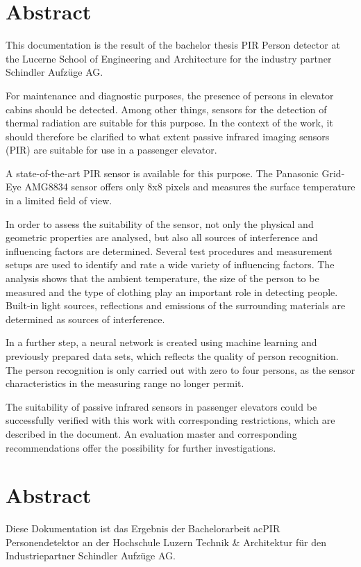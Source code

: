 \chapter*{Abstract}
\label{chap:abstract_german}
This documentation is the result of the bachelor thesis PIR Person detector at the Lucerne School of Engineering and Architecture for the industry partner Schindler Aufzüge AG.

For maintenance and diagnostic purposes, the presence of persons in elevator cabins should be detected. Among other things, sensors for the detection of thermal radiation are suitable for this purpose. In the context of the work, it should therefore be clarified to what extent passive infrared imaging sensors (PIR) are suitable for use in a passenger elevator. 

A state-of-the-art PIR sensor is available for this purpose. The Panasonic Grid-Eye AMG8834 sensor offers only 8x8 pixels and measures the surface temperature in a limited field of view.  

In order to assess the suitability of the sensor, not only the physical and geometric properties are analysed, but also all sources of interference and influencing factors are determined. Several test procedures and measurement setups are used to identify and rate a wide variety of influencing factors. The analysis shows that the ambient temperature, the size of the person to be measured and the type of clothing play an important role in detecting people. Built-in light sources, reflections and emissions of the surrounding materials are determined as sources of interference.  

In a further step, a neural network is created using machine learning and previously prepared data sets, which reflects the quality of person recognition. The person recognition is only carried out with zero to four persons, as the sensor characteristics in the measuring range no longer permit. 

The suitability of passive infrared sensors in passenger elevators could be successfully verified with this work with corresponding restrictions, which are described in the document.
An evaluation master and corresponding recommendations offer the possibility for further investigations. 


\chapter*{Abstract}
\label{chap:abstract_german}
Diese Dokumentation ist das Ergebnis der Bachelorarbeit ac{PIR} Personendetektor an der Hochschule Luzern Technik \& Architektur für den Industriepartner Schindler Aufzüge AG. 

